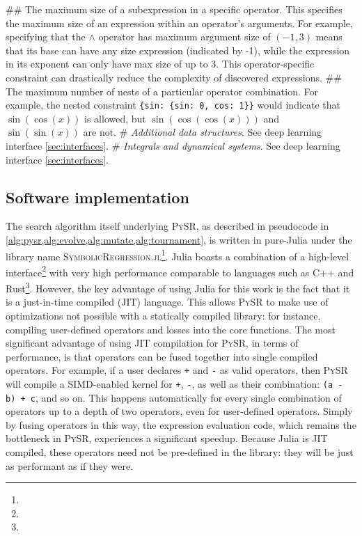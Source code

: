 \documentclass[letterpaper,twocolumn]{scrartcl}
\newcommand\pysr{\textsc{PySR}\xspace}
\newcommand\pysrjl{\textsc{SymbolicRegression.jl}\xspace}
\begin{document}
\begin{linenumbers}
\begin{easylist}[itemize]
## The maximum size of a subexpression in a specific operator.
This specifies the maximum size of an expression within an operator's arguments.
For example, specifying that the $\wedge$ operator has maximum argument size of $(-1, 3)$ means that its base can have any size expression (indicated by -1), while the expression in its exponent can only have max size of up to 3.
This operator-specific constraint can drastically reduce the complexity of discovered expressions.
## The maximum number of nests of a particular operator combination. For example, the nested constraint \texttt{\{sin: \{sin: 0, cos: 1\}\}} would indicate that $\sin(\cos(x))$ is allowed, but $\sin(\cos(\cos(x)))$ and $\sin(\sin(x))$ are not.
# \textit{Additional data structures}. See deep learning interface \cref{sec:interfaces}.
# \textit{Integrals and dynamical systems}. See deep learning interface \cref{sec:interfaces}.
\end{easylist}


\subsection{Software implementation}
\label{sec:software}

The search algorithm itself underlying \pysr, as described in pseudocode in \cref{alg:pysr,alg:evolve,alg:mutate,alg:tournament}, is written in pure-Julia under the library name \pysrjl\footnote{}.
Julia boasts a combination of a high-level interface\footnote{} with very high performance comparable to languages such as C++ and Rust\footnote{}.
However, the key advantage of using Julia for this work is the fact that it is a just-in-time compiled (JIT) language.
This allows \pysr to make use of optimizations not possible with a statically compiled library: for instance, compiling user-defined operators and losses into the core functions.
The most significant advantage of using JIT compilation for \pysr, in terms of performance, is that operators can be fused together into single compiled operators.
For example, if a user declares \texttt{+} and \texttt{-} as valid operators, then \pysr will compile a SIMD-enabled kernel for \texttt{+}, \texttt{-}, as well as their combination: \texttt{(a - b) + c}, and so on. This happens automatically for every single combination of operators up to a depth of two operators, even for user-defined operators.
Simply by fusing operators in this way, the expression evaluation code, which remains the bottleneck in \pysr, experiences a significant speedup.
Because Julia is JIT compiled, these operators need not be pre-defined in the library: they will be just as performant as if they were.


\end{linenumbers}
\end{document}
